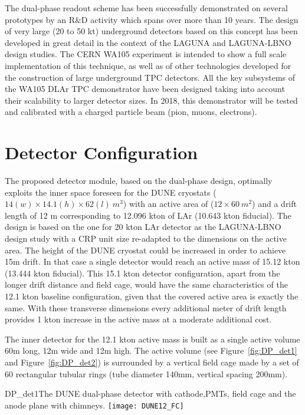The dual-phase readout scheme has been successfully demonstrated on several prototypes  by an R\&D activity which spans over more than 10 years. 
The design of very large (20 to 50 kt) underground detectors based on this concept has been developed in great detail in the context of the LAGUNA and LAGUNA-LBNO design studies.  The CERN WA105 experiment is intended to show a full scale implementation of this technique, as well as of other technologies developed for the construction of large underground TPC detectors.  All the key subsystems of the WA105 DLAr TPC demonstrator have been designed taking into account their scalability to larger detector sizes.  In 2018, this demonstrator will be tested and calibrated with a charged particle beam (pion, muons, electrons).


\section{Detector Configuration}

The proposed detector module, based on the dual-phase design, optimally exploits the inner space foreseen for the DUNE cryostats ($14 (w) \times 14.1 (h) \times 62  (l)~m^3$) with an active area of  ($12 \times 60 ~m^2$) and a drift length of 12 m corresponding to 12.096 kton of LAr (10.643 kton fiducial). The design is based on the one for 20 kton LAr detector as the LAGUNA-LBNO design study with a CRP unit size re-adapted to the dimensions on the active area. The height of the DUNE cryostat could be increased in order to achieve 15m  drift. In that case a single detector would reach an active mass of 15.12 kton (13.444 kton fiducial).  This 15.1 kton  detector configuration, apart from the longer drift distance and field cage, would have the same characteristics of the 12.1 kton baseline configuration, given that  the covered active area is exactly the same. With these transverse dimensions every additional meter of drift length provides 1 kton increase in the active mass at a moderate additional cost.

The inner detector for the 12.1 kton active mass is built as a single active volume 60m long, 12m wide and 12m high. The active volume (see Figure~\ref{fig:DP_det1} and Figure~\ref{fig:DP_det2}) is surrounded by a vertical field cage made by a set of 60 rectangular tubular rings (tube diameter 140mm, vertical spacing 200mm).

\begin{cdrfigure}{DP_det1}{The DUNE dual-phase detector with cathode,PMTs, field cage and the anode plane with chimneys.}
\texttt{[image: DUNE12\_FC]}
\end{cdrfigure}


